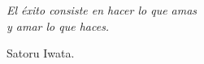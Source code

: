 \cleardoublepage %
\chapter*{}
\thispagestyle{empty}
\setlength{\leftmargin}{0.5\textwidth}
\setlength{\parsep}{0cm}
\addtolength{\topsep}{0.5cm}
\begin{flushright}
\small\em{
El éxito consiste en hacer lo que amas\\
y amar lo que haces.
}
\end{flushright}
\begin{flushright}
\small{
Satoru Iwata.
}
\end{flushright}
\cleardoublepage